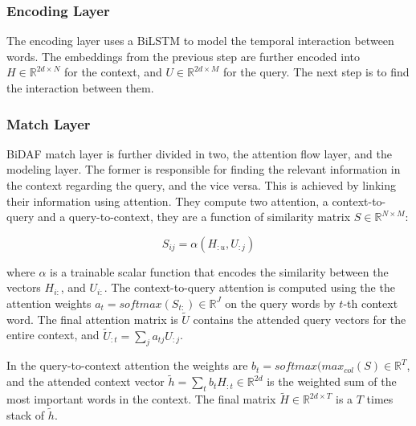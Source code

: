 \subsubsection{Encoding Layer}
The encoding layer uses a BiLSTM to model the temporal interaction between words. The embeddings from the previous step are further encoded into $H \in \mathbb{R}^{2d\times N}$ for the context, and $U \in \mathbb{R}^{2d\times M}$ for the query. The next step is to find the interaction between them.


\subsubsection{Match Layer}
BiDAF match layer is further divided in two, the attention flow layer, and the modeling layer.
The former is responsible for finding the relevant information in the context regarding the query, and the vice versa. This is achieved by linking their information using attention. They compute two attention, a context-to-query and a query-to-context, they are a function of similarity matrix $S \in \mathbb{R}^{N\times M}$:

\begin{equation}
    S_{ij}= \alpha(H_{:u}, U_{:j})
\end{equation}

where $\alpha$ is a trainable scalar function that encodes the similarity between the vectors $H_{i:}$, and $U_{i:}$. The context-to-query attention is computed using the the attention weights  $a_t = softmax(S_{t:}) \in \mathbb{R}^{J}$ on the query words by $t$-th context word. The final attention matrix is $\tilde{U}$  contains the attended query vectors for the entire context, and $\tilde{U}_{:t}  = \sum_{j}a_{tj}U_{:j}$.


In the query-to-context attention the weights are $b_t = softmax({max}_{col}(S) \in \mathbb{R}^{T}$, and the attended context vector $\tilde{h} = \sum_{t}b_tH_{:t} \in \mathbb{R}^{2d}$ is the weighted sum of the most important words in the context. The final matrix $\tilde{H} \in \mathbb{R}^{2d\times T}$ is a $T$ times stack of $\tilde{h}$.




